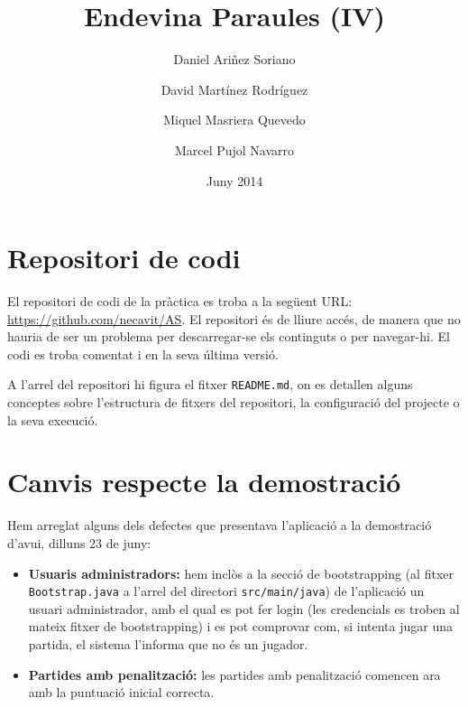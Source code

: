 \documentclass[a4paper]{scrartcl}
\title{Endevina Paraules (IV)}
\date{Juny 2014}
\author{Daniel Ariñez Soriano}
\author{David Martínez Rodríguez}
\author{Miquel Masriera Quevedo}
\author{Marcel Pujol Navarro\vspace{11cm}}
\affil{Arquitectura del Software\\Facultat d'Informàtica de Barcelona, UPC}
\begin{document}
	
	\maketitle
	\thispagestyle{empty}
	\newpage
	\cleardoublepage

	\section{Repositori de codi}
	El repositori de codi de la pràctica es troba a la següent URL: \url{https://github.com/necavit/AS}.
	El repositori és de lliure accés, de manera que no hauria de ser un problema per descarregar-se els
	continguts o per navegar-hi.
	El codi es troba comentat i en la seva última versió.
	
	A l'arrel del repositori hi figura el fitxer \texttt{README.md}, on es detallen alguns conceptes sobre
	l'estructura de fitxers del repositori, la configuració del projecte o la seva execució.

	\section{Canvis respecte la demostració}
	Hem arreglat alguns dels defectes que presentava l'aplicació a la demostració d'avui, dilluns 23 de juny:
	\begin{itemize}
		\item \textbf{Usuaris administradors:} hem inclòs a la secció de bootstrapping (al fitxer \texttt{Bootstrap.java}
		 a l'arrel del directori \texttt{src/main/java}) de l'aplicació un usuari administrador,
		amb el qual es pot fer login (les credencials es troben al mateix fitxer de bootstrapping) i es pot comprovar
		com, si intenta jugar una partida, el sistema l'informa que no és un jugador.
		\item \textbf{Partides amb penalització:} les partides amb penalització comencen ara amb la puntuació inicial
		correcta.
	\end{itemize}
    
\end{document}
